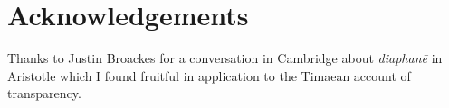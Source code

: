 \chapter*{Acknowledgements} %
\label{cha:acknowledgements}

Thanks to Justin Broackes for a conversation in Cambridge about \emph{diaphanē} in Aristotle which I found fruitful in application to the Timaean account of transparency.

